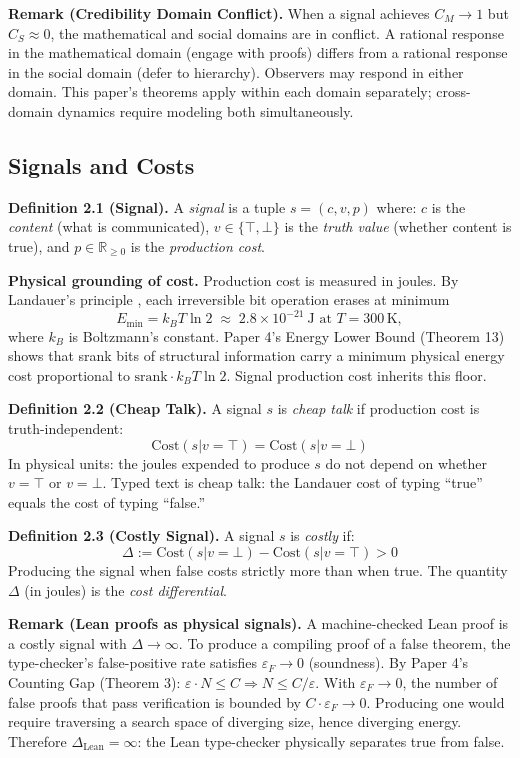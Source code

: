 \textbf{Remark (Credibility Domain Conflict).} When a signal achieves $C_M \to 1$ but $C_S \approx 0$, the mathematical and social domains are in conflict. A rational response in the mathematical domain (engage with proofs) differs from a rational response in the social domain (defer to hierarchy). Observers may respond in either domain. This paper's theorems apply within each domain separately; cross-domain dynamics require modeling both simultaneously.

\subsection{Signals and Costs}\label{signals-and-costs}

\textbf{Definition 2.1 (Signal).} A \emph{signal} is a tuple
\(s = (c, v, p)\) where: \(c\) is the \emph{content} (what is
communicated), \(v \in \{\top, \bot\}\) is the \emph{truth value}
(whether content is true), and \(p \in \mathbb{R}_{\geq 0}\) is the
\emph{production cost}.

\textbf{Physical grounding of cost.}
Production cost is measured in joules. By Landauer's principle \cite{landauer1961}, each
irreversible bit operation erases at minimum
\[
E_{\min} = k_B T \ln 2 \;\approx\; 2.8 \times 10^{-21}~\text{J at } T = 300\,\text{K},
\]
where $k_B$ is Boltzmann's constant. Paper 4's Energy Lower Bound (Theorem 13) shows that
srank bits of structural information carry a minimum physical energy cost
proportional to $\text{srank} \cdot k_B T \ln 2$. Signal production cost inherits this floor.

\textbf{Definition 2.2 (Cheap Talk).} A signal \(s\) is \emph{cheap
talk} if production cost is truth-independent:
\[\text{Cost}(s | v = \top) = \text{Cost}(s | v = \bot)\]
In physical units: the joules expended to produce $s$ do not depend on whether $v = \top$ or $v = \bot$.
Typed text is cheap talk: the Landauer cost of typing ``true'' equals the cost of typing ``false.''

\textbf{Definition 2.3 (Costly Signal).} A signal \(s\) is \emph{costly}
if:
\[\Delta := \text{Cost}(s | v = \bot) - \text{Cost}(s | v = \top) > 0\]
Producing the signal when false costs strictly more than when true. The quantity $\Delta$
(in joules) is the \emph{cost differential}.

\textbf{Remark (Lean proofs as physical signals).}
A machine-checked Lean proof is a costly signal with $\Delta \to \infty$. To produce a
compiling proof of a false theorem, the type-checker's false-positive rate satisfies
$\varepsilon_F \to 0$ (soundness). By Paper 4's Counting Gap (Theorem 3):
$\varepsilon \cdot N \leq C \Rightarrow N \leq C / \varepsilon$. With $\varepsilon_F \to 0$,
the number of false proofs that pass verification is bounded by $C \cdot \varepsilon_F \to 0$.
Producing one would require traversing a search space of diverging size, hence diverging energy.
Therefore $\Delta_{\text{Lean}} = \infty$: the Lean type-checker physically separates true from false.

